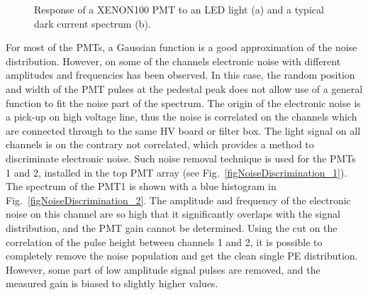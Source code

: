\begin{figure}[!h]
\centering
{}
\caption[Response of a XENON100 PMT to an LED light and a typical dark current spectrum]{Response of a XENON100 PMT to an LED light (a) and a typical dark current spectrum (b).}
\label{figPMTresponse}
\end{figure}

For most of the PMTs, a Gaussian function is a good approximation of the noise distribution. However, on some of the channels electronic noise with different amplitudes and frequencies has been observed. In this case, the random position and width of the PMT pulses at the pedestal peak does not allow use of a general function to fit the noise part of the spectrum. The origin of the electronic noise is a pick-up on high voltage line, thus the noise is correlated on the channels which are connected through to the same HV board or filter box. The light signal on all channels is on the contrary not correlated, which provides a method to discriminate electronic noise. Such noise removal technique is used for the PMTs 1 and 2, installed in the top PMT array (see Fig.~\ref{figNoiseDiscrimination_1}). The spectrum of the PMT1 is shown with a blue histogram in Fig.~\ref{figNoiseDiscrimination_2}. The amplitude and frequency of the electronic noise on this channel are so high that it significantly overlaps with the signal distribution, and the PMT gain cannot be determined. Using the cut on the correlation of the pulse height between channels 1 and 2, it is possible to completely remove the noise population and get the clean single PE distribution. However, some part of low amplitude signal pulses are removed, and the measured gain is biased to slightly higher values.

